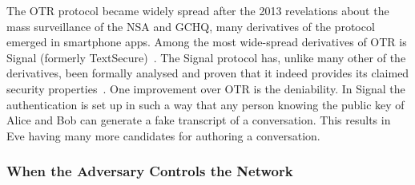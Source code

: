 The \ac{OTR} protocol became widely spread after the 2013 revelations about the
mass surveillance of the \ac{NSA} and \ac{GCHQ}, many derivatives of the 
protocol emerged in smartphone apps.
Among the most wide-spread derivatives of \ac{OTR} is Signal (formerly 
TextSecure)~\cite{SignalApp}.
The Signal protocol has, unlike many other of the derivatives, been formally 
analysed and proven that it indeed provides its claimed security 
properties~\cite{TextSecureAnalysis}.
One improvement over \ac{OTR} is the deniability.
In Signal the authentication is set up in such a way that any person knowing 
the public key of Alice and Bob can generate a fake transcript of 
a conversation.
This results in Eve having many more candidates for authoring a conversation.

\subsubsection{When the Adversary Controls the Network}



